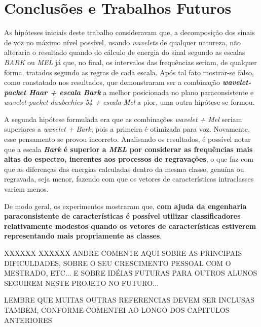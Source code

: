 \chapter{Conclusões e Trabalhos Futuros}
\label{chap:conclusions}
	\par As hipóteses iniciais deste trabalho consideravam que, a decomposição dos sinais de voz no máximo nível possível, usando \textit{wavelets} de qualquer natureza, não alteraria o resultado quando do cálculo de energia do sinal segundo as escalas \textit{BARK} ou \textit{MEL} já que, no final, os intervalos das frequências seriam, de qualquer forma, tratados segundo as regras de cada escala. Após tal fato mostrar-se falso, como constatado nos resultados, que demonstraram ser a combinação \textbf{\textit{wavelet-packet Haar + escala Bark}} a melhor posicionada no plano paraconsistente e \textit{wavelet-packet daubechies 54 + escala Mel} a pior, uma outra hipótese se formou.
	
	\par A segunda hipótese formulada era que as combinações \textit{wavelet + Mel} seriam superiores a \textit{wavelet + Bark}, pois a primeira é otimizada para voz. Novamente, esse pensamento se provou incorreto. Analisando os resultados, é possível notar que a escala \textbf{\textit{Bark} é superior a \textit{MEL} por considerar as frequências mais altas do espectro, inerentes aos processos de regravações}, o que faz com que as diferenças das energias calculadas dentro da mesma classe, genuína ou regravada, seja menor, fazendo com que os vetores de características intraclasses variem menos.

    \par De modo geral, os experimentos mostraram que, \textbf{com ajuda da engenharia paraconsistente de características é possível utilizar classificadores relativamente modestos quando os vetores de características estiverem representando mais propriamente as classes}.
    
    XXXXXX XXXXXX ANDRE COMENTE AQUI SOBRE AS PRINCIPAIS DIFICULDADES, SOBRE O SEU CRESCIMENTO PESSOAL COM O MESTRADO, ETC... E SOBRE IDÉIAS FUTURAS PARA OUTROS ALUNOS SEGUIREM NESTE PROJETO NO FUTURO... 
    
    LEMBRE QUE MUITAS OUTRAS REFERENCIAS DEVEM SER INCLUSAS TAMBEM, CONFORME COMENTEI AO LONGO DOS CAPITULOS ANTERIORES